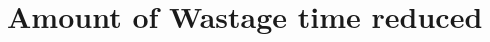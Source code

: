 \documentclass[conference]{IEEEtran}
\begin{document}
\section{Amount of Wastage time reduced}
%
%
%
\end{document}
